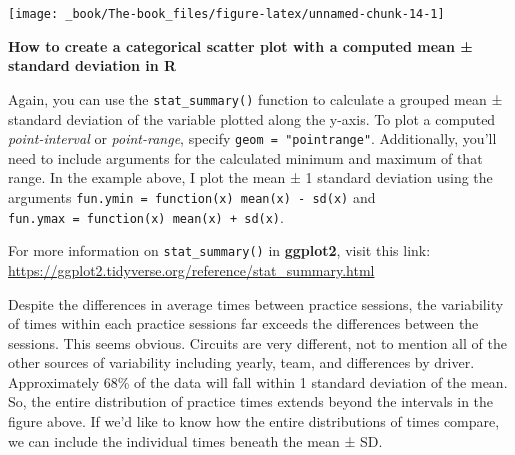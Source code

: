 \documentclass[
]{book}
\begin{document}
\begin{center}\texttt{[image: \_book/The-book\_files/figure-latex/unnamed-chunk-14-1]} \end{center}

\begin{blackbox}

\begin{center}
\textbf{How to create a categorical scatter plot with a computed mean ± standard deviation in R}

\end{center}

Again, you can use the \texttt{stat\_summary()} function to calculate a grouped mean ± standard deviation of the variable plotted along the y-axis. To plot a computed \emph{point-interval} or \emph{point-range}, specify \texttt{geom\ =\ "pointrange"}. Additionally, you'll need to include arguments for the calculated minimum and maximum of that range. In the example above, I plot the mean ± 1 standard deviation using the arguments \texttt{fun.ymin\ =\ function(x)\ mean(x)\ -\ sd(x)} and \texttt{fun.ymax\ =\ function(x)\ mean(x)\ +\ sd(x)}.

For more information on \texttt{stat\_summary()} in \textbf{ggplot2}, visit this link: \url{https://ggplot2.tidyverse.org/reference/stat_summary.html}

\end{blackbox}

Despite the differences in average times between practice sessions, the variability of times within each practice sessions far exceeds the differences between the sessions. This seems obvious. Circuits are very different, not to mention all of the other sources of variability including yearly, team, and differences by driver. Approximately 68\% of the data will fall within 1 standard deviation of the mean. So, the entire distribution of practice times extends beyond the intervals in the figure above. If we'd like to know how the entire distributions of times compare, we can include the individual times beneath the mean ± SD.
\end{document}

